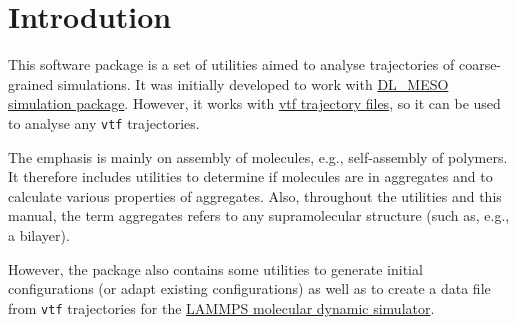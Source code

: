 \chapter{Introdution}

This software package is a set of utilities aimed to analyse trajectories
of coarse-grained simulations. It was initially developed to work with
\href{http://www.scd.stfc.ac.uk//research/app/ccg/software/DL_MESO/40694.aspx}{DL\_MESO
simulation package}. However, it works with
\href{https://github.com/olenz/vtfplugin/wiki/VTF-format}{vtf trajectory
files}, so it can be used to analyse any \texttt{vtf} trajectories.

The emphasis is mainly on assembly of molecules, e.g., self-assembly of
polymers. It therefore includes utilities to determine if molecules are in
aggregates and to calculate various properties of aggregates. Also,
throughout the utilities and this manual, the term aggregates refers to any
supramolecular structure (such as, e.g., a bilayer).

However, the package also contains some utilities to generate initial
configurations (or adapt existing configurations) as well as to create a
data file from \texttt{vtf} trajectories for the
\href{https://lammps.sandia.gov/}{LAMMPS molecular dynamic simulator}.

